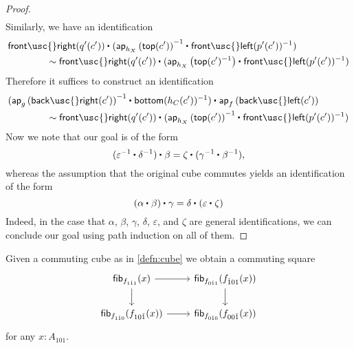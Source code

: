 \begin{proof}
\begin{align*}
  \end{align*}
  Similarly, we have an identification
  \begin{align*}
    & \ct{\mathsf{front\usc{}right}(q'(c'))}{(\ct{\ap{h_X}{\mathsf{top}(c')}^{-1}}{\mathsf{front\usc{}left}(p'(c'))^{-1}})} \\
    & \qquad\qquad \htpy \ct{\mathsf{front\usc{}right}(q'(c'))}{(\ct{\ap{h_X}{\mathsf{top}(c')^{-1}}}{\mathsf{front\usc{}left}(p'(c'))^{-1}})}
  \end{align*}
  Therefore it suffices to construct an identification
  \begin{align*}
    & \ct{(\ct{\ap{g}{\mathsf{back\usc{}right}(c')}^{-1}}{\mathsf{bottom}(h_C(c'))^{-1}})}{\ap{f}{\mathsf{back\usc{}left}(c')}} \\
    & \qquad\qquad \htpy \ct{\mathsf{front\usc{}right}(q'(c'))}{(\ct{\ap{h_X}{\mathsf{top}(c')}^{-1}}{\mathsf{front\usc{}left}(p'(c'))^{-1}})}
  \end{align*}
  Now we note that our goal is of the form
  \begin{equation*}
    \ct{(\ct{\varepsilon^{-1}}{\delta^{-1}})}{\beta}=\ct{\zeta}{(\ct{\gamma^{-1}}{\beta^{-1}})}, %
  \end{equation*}
  whereas the assumption that the original cube commutes yields an identification of the form
  \begin{equation*}
    \ct{(\ct{\alpha}{\beta})}{\gamma}=\ct{\delta}{(\ct{\varepsilon}{\zeta})}
  \end{equation*}
  Indeed, in the case that $\alpha$, $\beta$, $\gamma$, $\delta$, $\varepsilon$, and $\zeta$ are general identifications, we can conclude our goal using path induction on all of them.
\end{proof}

\begin{lem}
Given a commuting cube as in \cref{defn:cube} we obtain a commuting square
\begin{equation*}
\begin{tikzcd}
\fib{f_{1\check{1}1}}{x} \arrow[r] \arrow[d] & \fib{f_{0\check{1}1}}{f_{\check{1}01}(x)} \arrow[d] \\
\fib{f_{1\check{1}0}}{f_{10\check{1}}(x)} \arrow[r] & \fib{f_{0\check{1}0}}{f_{00\check{1}}(x)}
\end{tikzcd}
\end{equation*}
for any $x:A_{101}$. 
\end{lem}

